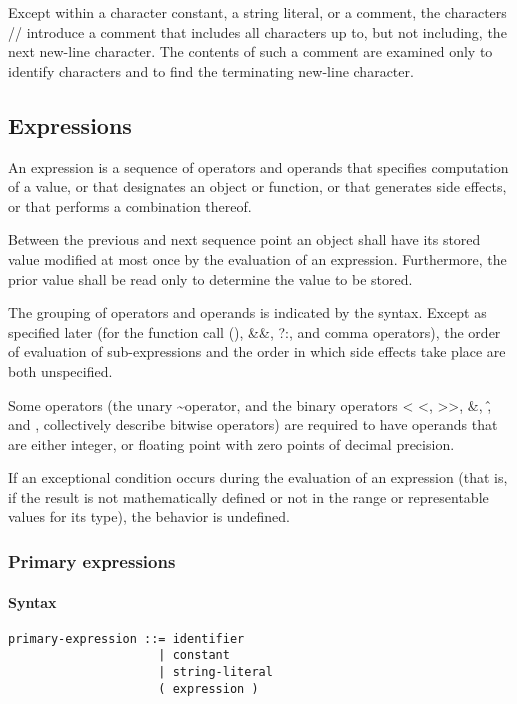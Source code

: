 \documentclass{article}
\begin{document}
Except within a character constant, a string literal, or a comment, the characters // 
introduce a comment that includes all characters up to, but not including, the next 
new-line character.  The contents of such a comment are examined only to identify 
characters and to find the terminating new-line character.
\linebreak

\subsection{Expressions}
An expression is a sequence of operators and operands that specifies computation of a 
value, or that designates an object or function, or that generates side effects, or that 
performs a combination thereof.
\linebreak

Between the previous and next sequence point an object shall have its stored value 
modified at most once by the evaluation of an expression. Furthermore, the prior value 
shall be read only to determine the value to be stored.
\linebreak

The grouping of operators and operands is indicated by the syntax. Except as specified 
later (for the function call (), \&\&, \textbar\textbar ?:, and comma operators), the 
order of evaluation of sub-expressions and the order in which side effects take place 
are both unspecified.
\linebreak

Some operators (the unary \textasciitilde operator, and the binary operators \textless
\textless, \textgreater\textgreater, \&, \^, and \textbar, collectively describe bitwise 
operators) are required to have operands that are either integer, or floating point with
zero points of decimal precision.
\linebreak

If an exceptional condition occurs during the evaluation of an expression (that is, if 
the result is not mathematically defined or not in the range or representable values for 
its type), the behavior is undefined.

\subsubsection{Primary expressions}
\paragraph*{Syntax}
\begin{lstlisting}[language=bnf]
primary-expression ::= identifier
                     | constant
                     | string-literal
                     ( expression )
\end{lstlisting}
\end{document}
